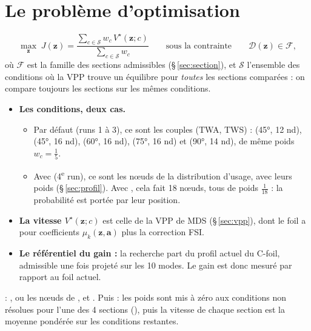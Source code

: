 \documentclass[10pt,a4paper]{article}
\newcommand{\vz}{\bm{z}}
\newcommand{\va}{\bm{a}}
\begin{document}
\section{Le problème d'optimisation}
\[
  \max_{\vz}\; J(\vz) = \frac{\sum_{c\in\mathcal{S}} w_c\,V^\star(\vz;c)}{\sum_{c\in\mathcal{S}} w_c}
  \qquad\text{sous la contrainte}\qquad \mathcal{D}(\vz)\in\mathcal{F},
\]
où $\mathcal{F}$ est la famille des sections admissibles (§\,\ref{sec:section}), et $\mathcal{S}$ l'ensemble
des conditions où la VPP trouve un équilibre pour \emph{toutes} les sections comparées : on compare toujours
les sections sur les mêmes conditions.

\begin{itemize}
  \item \textbf{Les conditions, deux cas.}
        \begin{itemize}
          \item Par défaut (runs 1 à 3), ce sont les couples (TWA, TWS) : (45°, 12 nd), (45°, 16 nd),
                (60°, 16 nd), (75°, 16 nd) et (90°, 14 nd), de même poids $w_c=\frac15$.
          \item Avec  (4\textsuperscript{e} run), ce sont les nœuds de la distribution
                d'usage, avec leurs poids (§\,\ref{sec:profil}). Avec , cela
                fait 18 nœuds, tous de poids $\frac1{18}$ : la probabilité est portée par leur position.
        \end{itemize}
  \item \textbf{La vitesse $V^\star(\vz;c)$} est celle de la VPP de MDS (§\,\ref{sec:vpp}), dont le foil a pour
        coefficients $\mu_k(\vz,\va)$ plus la correction FSI.
  \item \textbf{Le référentiel du gain :} la recherche part du profil actuel du C-foil, admissible une fois
        projeté sur les 10 modes. Le gain est donc mesuré par rapport au foil actuel.
\end{itemize}

\begin{danslecode}
 : , ou les nœuds de , et
. Puis  : les poids sont mis à zéro aux conditions non
résolues pour l'une des 4 sections (), puis la vitesse
de chaque section est la moyenne pondérée sur les conditions restantes.
\end{danslecode}
\end{document}
